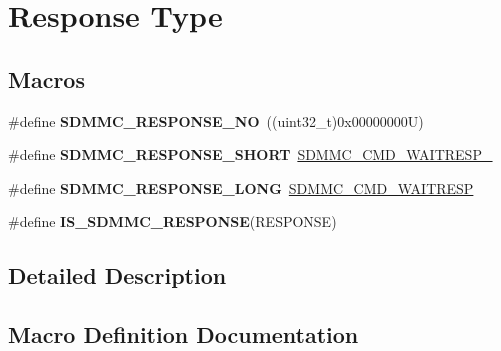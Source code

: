 \hypertarget{group___s_d_m_m_c___l_l___response___type}{}\section{Response Type}
\label{group___s_d_m_m_c___l_l___response___type}
\subsection*{Macros}
\begin{DoxyCompactItemize}
\item 
\mbox{\label{group___s_d_m_m_c___l_l___response___type_ga5c371a0bb72a4c214e61993432891b41}} 
\#define {\bfseries S\+D\+M\+M\+C\+\_\+\+R\+E\+S\+P\+O\+N\+S\+E\+\_\+\+NO}~((uint32\+\_\+t)0x00000000\+U)
\item 
\mbox{\label{group___s_d_m_m_c___l_l___response___type_ga1377948ef9d686d70ef9d664d049e2f0}} 
\#define {\bfseries S\+D\+M\+M\+C\+\_\+\+R\+E\+S\+P\+O\+N\+S\+E\+\_\+\+S\+H\+O\+RT}~\mbox{\hyperlink{group___peripheral___registers___bits___definition_gad02708f4a3f5070683c373c7aeb3f035}{S\+D\+M\+M\+C\+\_\+\+C\+M\+D\+\_\+\+W\+A\+I\+T\+R\+E\+S\+P\+\_}}
\item 
\mbox{\label{group___s_d_m_m_c___l_l___response___type_gac6f990696478d80dde6cdf86517d1df2}} 
\#define {\bfseries S\+D\+M\+M\+C\+\_\+\+R\+E\+S\+P\+O\+N\+S\+E\+\_\+\+L\+O\+NG}~\mbox{\hyperlink{group___peripheral___registers___bits___definition_ga88d333417d67929cdd916b947323cf7e}{S\+D\+M\+M\+C\+\_\+\+C\+M\+D\+\_\+\+W\+A\+I\+T\+R\+E\+SP}}
\item 
\#define {\bfseries I\+S\+\_\+\+S\+D\+M\+M\+C\+\_\+\+R\+E\+S\+P\+O\+N\+SE}(R\+E\+S\+P\+O\+N\+SE)
\end{DoxyCompactItemize}


\subsection{Detailed Description}


\subsection{Macro Definition Documentation}
\mbox{\label{group___s_d_m_m_c___l_l___response___type_ga05b334dc0353cc3734060b388663eecb}} 
